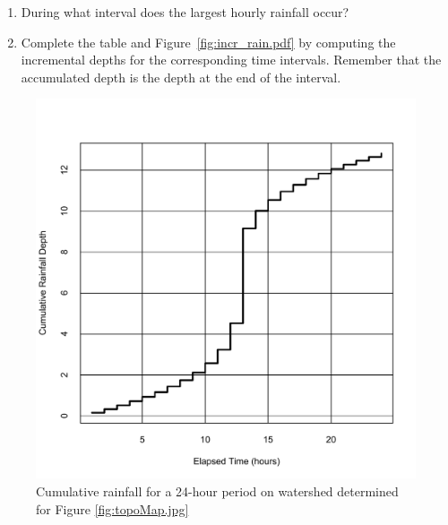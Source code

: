 \documentclass[12pt]{article}
\begin{document}
\begin{enumerate}
\begin{enumerate}
\item During what interval does the largest hourly rainfall occur?
\item Complete the table and Figure~\ref{fig:incr_rain.pdf} by computing the incremental depths for the corresponding time intervals.  Remember that the accumulated depth is the depth at the end of the interval.
\end{enumerate}

\begin{figure}[h!] %
   \centering
   \includegraphics[width=5in]{accum_rain.pdf} 
   \caption{Cumulative rainfall for a 24-hour period on watershed determined for Figure \ref{fig:topoMap.jpg}}
   \label{fig:accum_rain.pdf}
\end{figure}


\end{enumerate}
\end{document}
